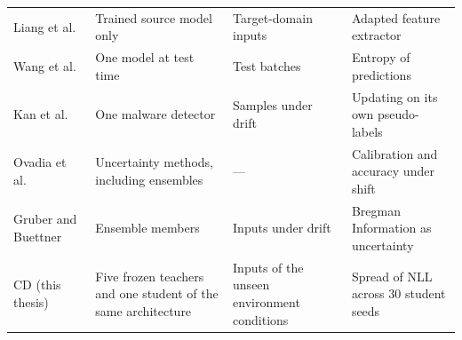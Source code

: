 {\begin{xltabular}{\textwidth}{@{}>{\raggedright\arraybackslash}p{0.22\textwidth}>{\raggedright\arraybackslash}X>{\raggedright\arraybackslash}p{0.2\textwidth}>{\raggedright\arraybackslash}X@{}}
Liang et al.~\cite{liang2020do}
 & Trained source model only & Target-domain inputs & Adapted feature extractor \\
Wang et al.~\cite{wang2021tent}
 & One model at test time & Test batches & Entropy of predictions \\
Kan et al.~\cite{kan2021investigating}
 & One malware detector & Samples under drift & Updating on its own pseudo-labels \\
\midrule
Ovadia et al.~\cite{ovadia2019trust}
 & Uncertainty methods, including ensembles & --- & Calibration and accuracy under shift \\
Gruber and Buettner~\cite{gruber2022uncertainty}
 & Ensemble members & Inputs under drift & Bregman Information as uncertainty \\
\midrule
CD (this thesis)
 & Five frozen teachers and one student of the same architecture
 & Inputs of the unseen environment conditions
 & Spread of NLL across 30 student seeds \\
\end{xltabular}}
